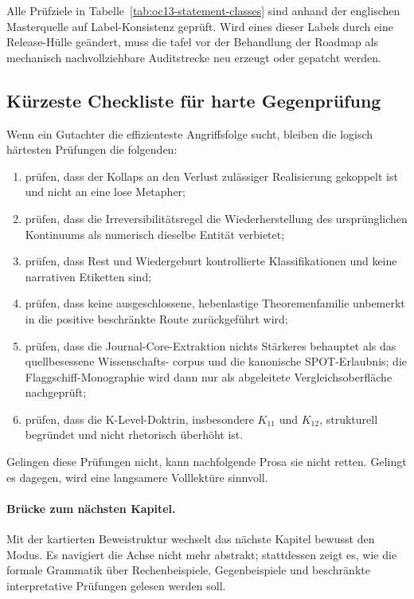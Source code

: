 Alle Prüfziele in Tabelle~\ref{tab:oc13-statement-classes} sind anhand der englischen Masterquelle
auf Label-Konsistenz geprüft. Wird eines dieser Labels durch eine Release-Hülle geändert, muss die
tafel vor der Behandlung der Roadmap als mechanisch nachvollziehbare Auditstrecke neu erzeugt oder
gepatcht werden.

\subsection{Kürzeste Checkliste für harte Gegenprüfung}

Wenn ein Gutachter die effizienteste Angriffsfolge sucht, bleiben die logisch härtesten Prüfungen
die folgenden:

\begin{enumerate}
\item prüfen, dass der Kollaps an den Verlust zulässiger Realisierung gekoppelt ist und nicht an eine lose Metapher;
\item prüfen, dass die Irreversibilitätsregel die Wiederherstellung des ursprünglichen Kontinuums als numerisch
      dieselbe Entität verbietet;
\item prüfen, dass Rest und Wiedergeburt kontrollierte Klassifikationen und keine narrativen Etiketten sind;
\item prüfen, dass keine ausgeschlossene, hebenlastige Theoremenfamilie unbemerkt in die positive beschränkte
      Route zurückgeführt wird;
\item prüfen, dass die Journal-Core-Extraktion nichts Stärkeres behauptet als das quellbesessene Wissenschafts-
      corpus und die kanonische SPOT-Erlaubnis; die Flaggschiff-Monographie wird dann nur als abgeleitete
      Vergleichsoberfläche nachgeprüft;
\item prüfen, dass die K-Level-Doktrin, insbesondere \(K_{11}\) und \(K_{12}\), strukturell begründet und nicht
      rhetorisch überhöht ist.
\end{enumerate}

Gelingen diese Prüfungen nicht, kann nachfolgende Prosa sie nicht retten. Gelingt
es dagegen, wird eine langsamere Volllektüre sinnvoll.

\paragraph{Brücke zum nächsten Kapitel.}
Mit der kartierten Beweistruktur wechselt das nächste Kapitel bewusst den Modus. Es navigiert die Achse nicht
mehr abstrakt; stattdessen zeigt es, wie die formale Grammatik über Rechenbeispiele, Gegenbeispiele
und beschränkte interpretative Prüfungen gelesen werden soll.

\clearpage
